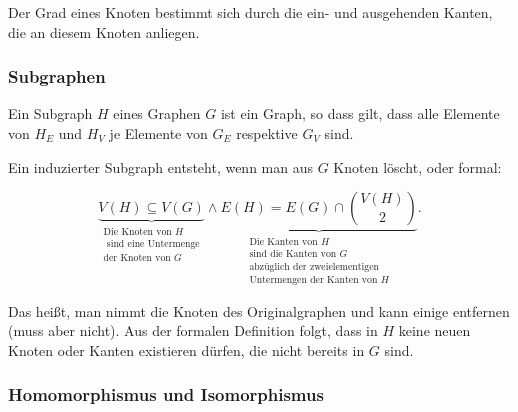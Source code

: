 \documentclass{scrartcl}
\begin{document}
Der Grad eines Knoten bestimmt sich durch die ein- und ausgehenden Kanten, die an diesem Knoten anliegen.

\subsubsection{Subgraphen}

\label{subgraph}

Ein Subgraph $H$ eines Graphen $G$ ist ein Graph, so dass gilt, dass alle Elemente von $H_E$ und $H_V$ je Elemente von $G_E$ respektive
$G_V$ sind.

Ein induzierter Subgraph entsteht, wenn man aus $G$ Knoten löscht, oder formal: 

\begin{equation}
	\underbrace{V(H) \subseteq V(G)}_{\substack{\text{Die Knoten von } H \\ \text{ sind eine Untermenge}\\ \text{der Knoten von } G}} 
	\wedge 
	\underbrace{E(H) = E(G) \cap \binom{V(H)}{2}}_{\substack{\text{Die Kanten von } H \\ \text{sind die Kanten von } G\\ \text{abzüglich der zweielementigen}\\ \text{Untermengen der Kanten von } H }}.
\end{equation}

Das heißt, man nimmt die Knoten des Originalgraphen und kann einige entfernen (muss aber nicht). Aus der formalen Definition folgt,
dass in $H$ keine neuen Knoten oder Kanten existieren dürfen, die nicht bereits in $G$ sind.

\subsubsection{Homomorphismus und Isomorphismus}

\end{document}
